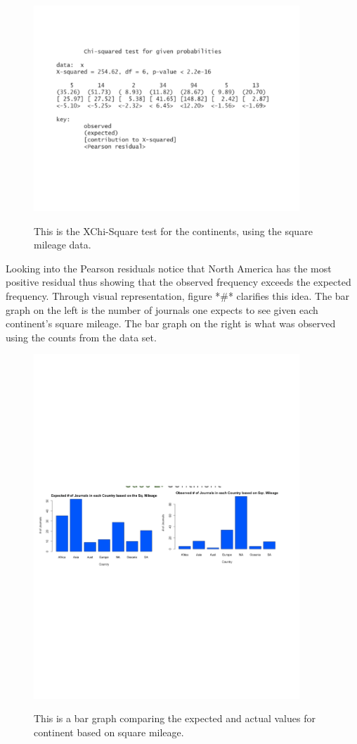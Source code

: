 \documentclass[12pt, letterpaper]{article}
\begin{document}
\begin{figure}[h]
\begin{center}
\includegraphics[width=10cm]{ContinentChiSquare2.pdf}
\label{fig: Continent XChi-Square with Square Mileage}
\caption{This is the XChi-Square test for the continents, using the square mileage data.}
\end{center}
\end{figure}

Looking into the Pearson residuals notice that North America has the most positive residual thus showing that the observed frequency exceeds the expected frequency. Through visual representation, figure *#* clarifies this idea. The bar graph on the left is the number of journals one expects to see given each continent's square mileage. The bar graph on the right is what was observed using the counts from the data set.
\begin{figure}[h]
\begin{center}
\includegraphics[width=10cm]{Continent2BarGraph.pdf}
\label{fig: Continent Bar Graph}
\caption{This is a bar graph comparing the expected and actual values for continent based on square mileage.}
\end{center}
\end{figure}
\end{document}
